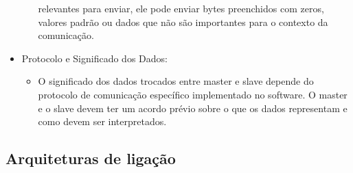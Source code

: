 \documentclass[a4paper, 12pt, onecolumn, oneside]{scrartcl}
\begin{document}
\begin{itemize}
\begin{itemize}
        relevantes para enviar, ele pode enviar bytes preenchidos com zeros, valores padrão ou dados que não 
        são importantes para o contexto da comunicação.
    \end{itemize}
    \item Protocolo e Significado dos Dados:
    \begin{itemize}
        \item O significado dos dados trocados entre master e slave depende do protocolo de comunicação específico 
        implementado no software. O master e o slave devem ter um acordo prévio sobre o que os dados representam e 
        como devem ser interpretados.
    \end{itemize}
\end{itemize}

\clearpage
\subsection{Arquiteturas de ligação}
\end{document}
